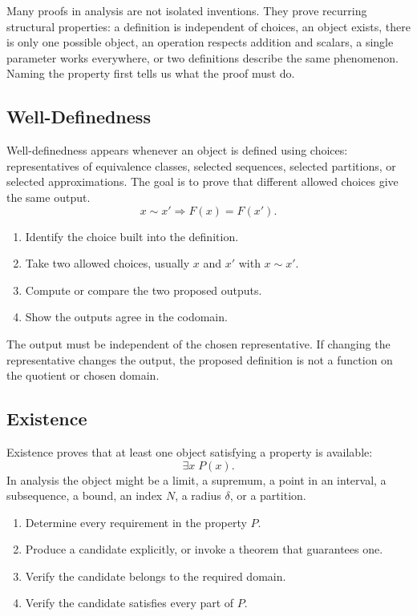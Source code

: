 Many proofs in analysis are not isolated inventions. They prove recurring
structural properties: a definition is independent of choices, an object
exists, there is only one possible object, an operation respects addition and
scalars, a single parameter works everywhere, or two definitions describe the
same phenomenon. Naming the property first tells us what the proof must do.

\subsection*{Well-Definedness}
\label{subsec:property-well-definedness}

Well-definedness appears whenever an object is defined using choices:
representatives of equivalence classes, selected sequences, selected
partitions, or selected approximations. The goal is to prove that different
allowed choices give the same output.
\[
  x\sim x' \Rightarrow F(x)=F(x').
\]

\begin{remark}
\begin{enumerate}
  \item Identify the choice built into the definition.
  \item Take two allowed choices, usually $x$ and $x'$ with $x\sim x'$.
  \item Compute or compare the two proposed outputs.
  \item Show the outputs agree in the codomain.
\end{enumerate}
\end{remark}

\begin{remark}
The output must be independent of the chosen representative. If changing the
representative changes the output, the proposed definition is not a function
on the quotient or chosen domain.
\end{remark}

\subsection*{Existence}
\label{subsec:property-existence}

Existence proves that at least one object satisfying a property is available:
\[
  \exists x\;P(x).
\]
In analysis the object might be a limit, a supremum, a point in an interval,
a subsequence, a bound, an index $N$, a radius $\delta$, or a partition.

\begin{remark}
\begin{enumerate}
  \item Determine every requirement in the property $P$.
  \item Produce a candidate explicitly, or invoke a theorem that guarantees
        one.
  \item Verify the candidate belongs to the required domain.
  \item Verify the candidate satisfies every part of $P$.
\end{enumerate}
\end{remark}

